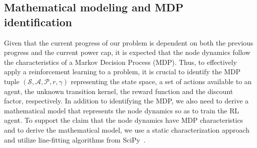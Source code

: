 \subsection{Mathematical modeling and MDP identification} \label{subsec:Mathematical_Modeling}
Given that the current progress of our problem is dependent on both the previous progress and the current power cap, it is expected that the node dynamics follow the characteristics of a Markov Decision Process (MDP). 
Thus, to effectively apply a reinforcement learning to a problem, it is crucial to identify the MDP tuple $(\mathcal{S}, \mathcal{A}, \mathcal{P},r,\gamma)$ representing the state space, a set of actions available to an agent, the unknown transition kernel, the reward function and the discount factor, respectively. In addition to identifying the MDP, we also need to derive a mathematical model that represents the node dynamics so as to train the RL agent. To support the claim that the node dynamics have MDP characteristics and to derive the mathematical model, we use a static characterization approach and utilize line-fitting algorithms from SciPy~\cite{2020SciPy-NMeth}.

